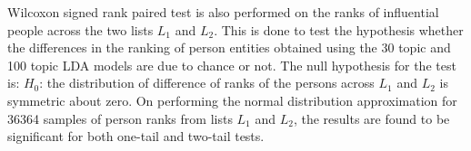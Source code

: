 Wilcoxon signed rank paired test is also performed on the ranks of influential people across the two lists $L_1$ and $L_2$. This is done to test the hypothesis whether the differences in the ranking of person entities obtained using the 30 topic and 100 topic LDA models are due to chance or not. The null hypothesis for the test is: 
$H_0$: the distribution of difference of ranks of the persons across $L_1$ and $L_2$ is symmetric about zero. On performing the normal distribution approximation for 36364 samples of person ranks from lists $L_1$ and $L_2$, the results are found to be significant for both one-tail and two-tail tests.


